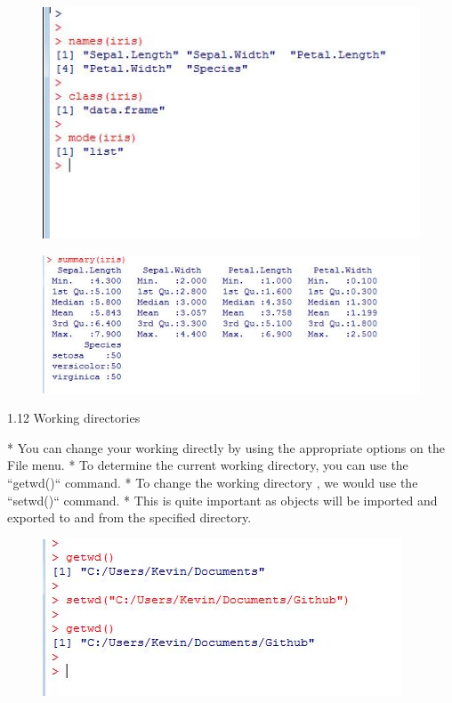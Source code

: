\documentclass{beamer}
\begin{document}
\begin{figure}  
\includegraphics[width=1.2\linewidth]{images/irisinspect}     
\end{figure}
   

\begin{figure}
\centering
\includegraphics[width=1.2\linewidth]{images/irissummary}
\end{figure}
   





{1.12 Working directories}


* You can change your working directly by using the appropriate options on the File menu. 
* To
determine the current working directory, you can use the ``getwd()`` command. 
* To change the
working directory , we would use the ``setwd()`` command.
*  This is quite important as objects
will be imported and exported to and from the specified directory.



\begin{figure}
\centering
\includegraphics[width=1.2\linewidth]{images/workingdir}

\end{figure}
\end{document}
